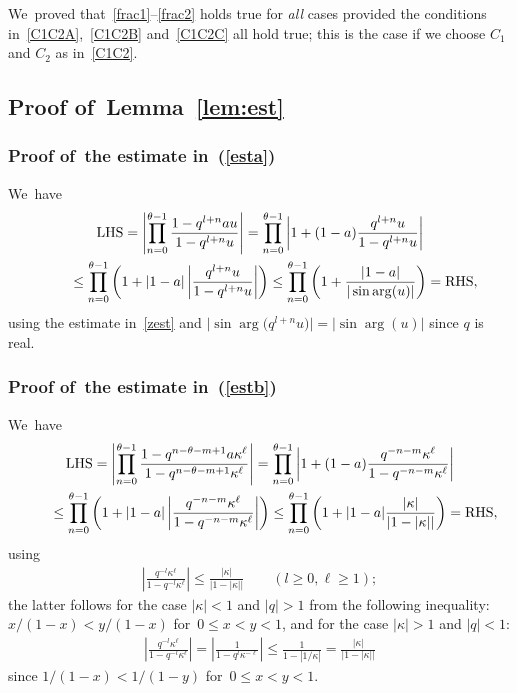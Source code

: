 \documentclass[11pt]{article}
\numberwithin{equation}{section}
\begin{document}
We~proved that~\eqref{frac1}--\eqref{frac2} holds true for {\em all} cases provided the conditions in~\eqref{C1C2A},~\eqref{C1C2B} and~\eqref{C1C2C} all hold true; this is the case if we choose $C_1$ and $C_2$ as in~\eqref{C1C2}.

\subsection[Proof of~Lemma~B1]{Proof of~Lemma~\ref{lem:est}}\label{app:prooflem:est}
\subsubsection[Proof of~the estimate in (B.5)]{Proof of~the estimate in~(\ref{esta})}
We~have
\begin{gather*}
\text{LHS} = \left|\prod_{n=0}^{\theta-1}\frac{1-q^{l+n}au}{1-q^{l+n}u} \right| = \prod_{n=0}^{\theta-1}\left|1+(1-a)\frac{q^{l+n}u}{1-q^{l +n}u} \right|
\\ \hphantom{\text{LHS}}
{}\leq \prod_{n=0}^{\theta-1}\left(1+|1-a|\left|\frac{q^{l+n}u}{1-q^{l+n}u}\right| \right)\leq \prod_{n=0}^{\theta-1}\left(1+\frac{|1-a|}{|\sin\arg(u)|}\right) =
\text{RHS},
\end{gather*}
using the estimate in~\eqref{zest} and $\big|\sin\arg\big(q^{l+n}u\big)\big|=|\sin\arg(u)|$ since $q$ is real.

\subsubsection[Proof of~the estimate in (B.6)]{Proof of~the estimate in~(\ref{estb})}
\label{app:estb}
We~have
\begin{gather*}
\text{LHS} = \left| \prod_{n=0}^{\theta-1} \frac{1- q^{n-\theta-m+1}a\kappa^\ell }{1-q^{n-\theta-m+1} \kappa^\ell } \right| = \prod_{n=0}^{\theta-1}\left| 1+(1-a)\frac{q^{-n-m}\kappa^\ell}{1-q^{-n-m}\kappa^\ell}\right|
\\ \hphantom{\text{LHS}}
{}\leq \prod_{n=0}^{\theta-1}\left( 1+|1-a|\left|\frac{q^{-n-m}\kappa^\ell}{1-q^{-n-m}\kappa^\ell}\right|\right)
\leq \prod_{n=0}^{\theta-1}\left( 1+|1-a|\frac{|\kappa|}{|1-|\kappa||}\right) =\text{RHS},
\end{gather*}
using
\begin{gather*}
\left|\frac{q^{-l}\kappa^\ell}{1-q^{-l}\kappa^\ell}\right|\leq \frac{|\kappa|}{|1-|\kappa||}\qquad
(l\geq 0, \ell\geq 1);
\end{gather*}
the latter follows for the case $|\kappa|<1$ and $|q|>1$ from the following inequality: $x/(1-x)<y/(1-x)$ for~$0\leq x<y<1$, and for the case $|\kappa|>1$ and $|q|<1$:
\begin{gather*}
\left|\frac{q^{-l}\kappa^\ell}{1-q^{-l}\kappa^\ell}\right| = \left|\frac{1}{1-q^{l}\kappa^{-\ell}}\right| \leq \frac1{1-|1/\kappa|} = \frac{|\kappa|}{|1-|\kappa||}
\end{gather*}
since $1/(1-x)<1/(1-y)$ for~$0\leq x<y<1$.
\end{document}
